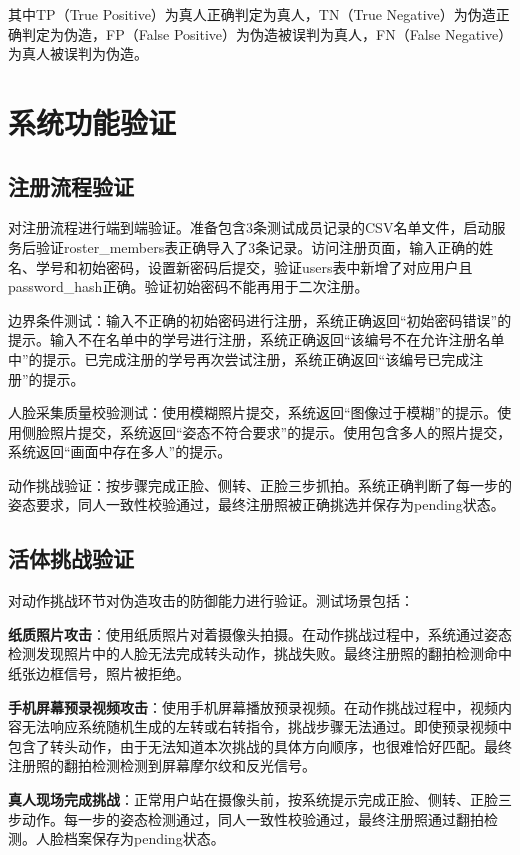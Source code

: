 其中TP（True Positive）为真人正确判定为真人，TN（True Negative）为伪造正确判定为伪造，FP（False Positive）为伪造被误判为真人，FN（False Negative）为真人被误判为伪造。

\section{系统功能验证}

\subsection{注册流程验证}

对注册流程进行端到端验证。准备包含3条测试成员记录的CSV名单文件，启动服务后验证roster\_members表正确导入了3条记录。访问注册页面，输入正确的姓名、学号和初始密码，设置新密码后提交，验证users表中新增了对应用户且password\_hash正确。验证初始密码不能再用于二次注册。

边界条件测试：输入不正确的初始密码进行注册，系统正确返回``初始密码错误''的提示。输入不在名单中的学号进行注册，系统正确返回``该编号不在允许注册名单中''的提示。已完成注册的学号再次尝试注册，系统正确返回``该编号已完成注册''的提示。

人脸采集质量校验测试：使用模糊照片提交，系统返回``图像过于模糊''的提示。使用侧脸照片提交，系统返回``姿态不符合要求''的提示。使用包含多人的照片提交，系统返回``画面中存在多人''的提示。

动作挑战验证：按步骤完成正脸、侧转、正脸三步抓拍。系统正确判断了每一步的姿态要求，同人一致性校验通过，最终注册照被正确挑选并保存为pending状态。

\subsection{活体挑战验证}

对动作挑战环节对伪造攻击的防御能力进行验证。测试场景包括：

\textbf{纸质照片攻击}：使用纸质照片对着摄像头拍摄。在动作挑战过程中，系统通过姿态检测发现照片中的人脸无法完成转头动作，挑战失败。最终注册照的翻拍检测命中纸张边框信号，照片被拒绝。

\textbf{手机屏幕预录视频攻击}：使用手机屏幕播放预录视频。在动作挑战过程中，视频内容无法响应系统随机生成的左转或右转指令，挑战步骤无法通过。即使预录视频中包含了转头动作，由于无法知道本次挑战的具体方向顺序，也很难恰好匹配。最终注册照的翻拍检测检测到屏幕摩尔纹和反光信号。

\textbf{真人现场完成挑战}：正常用户站在摄像头前，按系统提示完成正脸、侧转、正脸三步动作。每一步的姿态检测通过，同人一致性校验通过，最终注册照通过翻拍检测。人脸档案保存为pending状态。

